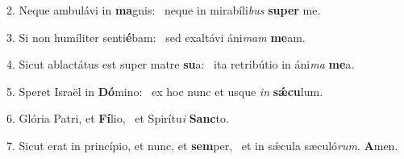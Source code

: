 2. Neque ambulávi in \textbf{ma}gnis: \ast\  neque in mirabíli\textit{bus} \textbf{su}\textbf{per} me.\

3. Si non humíliter senti\textbf{é}bam: \ast\  sed exaltávi áni\textit{mam} \textbf{me}am.\

4. Sicut ablactátus est super matre \textbf{su}a: \ast\  ita retribútio in áni\textit{ma} \textbf{me}a.\

5. Speret Israël in \textbf{Dó}mino: \ast\  ex hoc nunc et usque \textit{in} \textbf{sǽ}\textbf{cu}lum.\

6. Glória Patri, et \textbf{Fí}lio, \ast\  et Spirítu\textit{i} \textbf{Sanc}to.\

7. Sicut erat in princípio, et nunc, et \textbf{sem}per, \ast\  et in sǽcula sæculó\textit{rum}. \textbf{A}men.\

